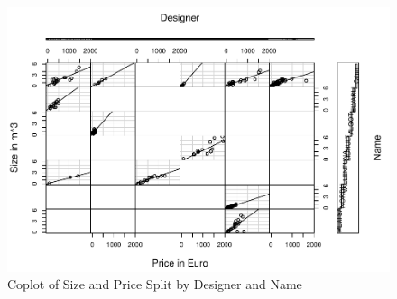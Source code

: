 \documentclass[a4paper, nobind]{templates/ociamthesis}
\begin{document}
\begin{figure}[!h]
\includegraphics[width=1\linewidth,height=0.8\textheight]{_main_files/figure-latex/coplot-code-designer-name-1} \caption{Coplot of Size and Price Split by Designer and Name}\label{fig:coplot-code-designer-name}
\end{figure}
\end{document}
